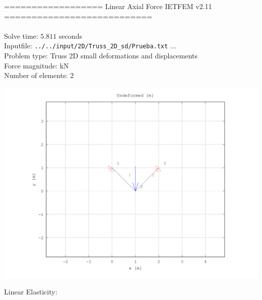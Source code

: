 \documentclass[a4paper,11pt]{article}
\begin{document}

================== Linear Axial Force IETFEM v2.11 ===========================\\\\


Solve time: $ 5.811$ seconds \\

Inputfile: \verb|../../input/2D/Truss_2D_sd/Prueba.txt|  ... \\

Problem type: Truss 2D small deformations and displacements\\ 

Force magnitude: kN \\

Number of elements: 2 \\

\newpage       

\begin{center}       
\includegraphics[width=.80\textwidth]{../../Prueba_undeformed.png}   
   \end{center}       

Linear Elasticity:\\
\end{document}

